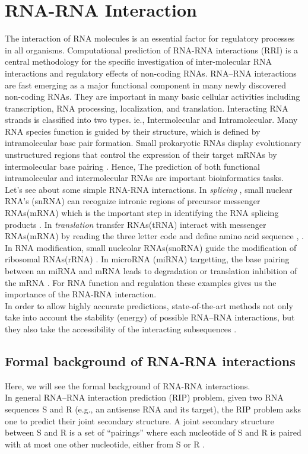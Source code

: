 \documentclass[twoside,a4paper]{report}
\begin{document}
	
	\section{RNA-RNA Interaction}
 	The interaction of RNA molecules is an essential factor for regulatory processes in all organisms. Computational prediction of RNA-RNA interactions (RRI) is a central methodology for the specific investigation of inter-molecular RNA interactions and regulatory effects of non-coding RNAs. RNA–RNA interactions are fast emerging as a major functional component in many newly discovered non-coding RNAs. They are important in many basic cellular activities including transcription, RNA processing, localization, and translation. Interacting RNA strands is classified into two types. ie., Intermolecular and Intramolecular. Many RNA species function is guided by their structure, which is defined by intramolecular base pair formation. Small prokaryotic RNAs display evolutionary unstructured regions that control the expression of their target mRNAs by intermolecular base pairing \citep{wright2013comparative}. Hence, The prediction of both functional intramolecular and intermolecular RNAs are important bioinformatics tasks. \\
 	
 	Let's see about some simple RNA-RNA interactions. In \textit{splicing} , small nuclear RNA's (snRNA) can recognize intronic regions of precursor messenger RNAs(mRNA) which is the important step in identifying the RNA splicing products \citep{modrek2002genomic}. In \textit{translation} transfer RNAs(tRNA) interact with messenger RNAs(mRNA) by reading the three letter code and define amino acid sequence \citep{selmer2006structure}, \citep{ibba2000aminoacyl}. In RNA modification, small nucleolar RNAs(snoRNA) guide the modification of ribosomal RNAs(rRNA) \cite{kiss2002small}. In microRNA (miRNA) targetting, the base pairing between an miRNA and mRNA leads to degradation or translation inhibition of the mRNA \cite{bartel2004micrornas}. For RNA function and regulation these examples gives us the importance of the RNA-RNA interaction. \\
 		
 	In order to allow highly accurate predictions, state-of-the-art methods not only take into account the stability (energy) of possible RNA–RNA interactions, but they also take the accessibility of the interacting subsequences \citep{umu2017comprehensive}.\\
 	
 	\subsection{Formal background of RNA-RNA interactions}
 	Here, we will see the formal background of RNA-RNA interactions.\\
 	In general RNA–RNA interaction prediction (RIP) problem, given two RNA sequences S and R (e.g., an antisense RNA and its target), the RIP problem asks one to predict their joint secondary structure. A joint secondary structure between S and R is a set of “pairings” where each nucleotide of S and R is paired with at most one other nucleotide, either from S or R \citep{alkan2006rna}.  \\
 	
\end{document}

